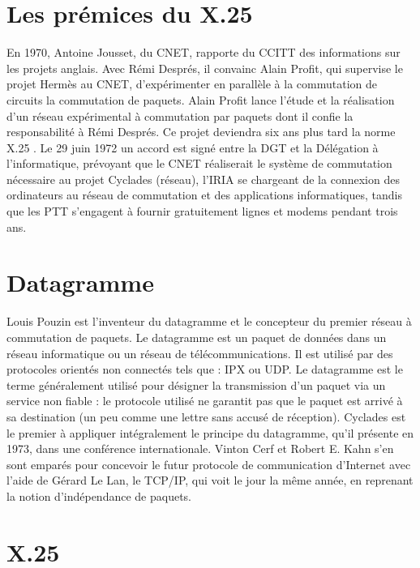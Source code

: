 \documentclass[12pt]{report}
\begin{document}
\section{Les prémices du X.25}

En 1970, Antoine Jousset, du \gls{CNET}, rapporte du \gls{CCITT} des informations sur les projets anglais. Avec Rémi Després, il convainc Alain Profit, qui supervise le projet Hermès au CNET, d’expérimenter en parallèle à la commutation de circuits la commutation de paquets. Alain Profit lance l'étude et la réalisation d'un réseau expérimental à commutation par paquets dont il confie la responsabilité à Rémi Després. Ce projet deviendra six ans plus tard la norme X.25 \cite{wikicnet}. Le 29 juin 1972 un accord est signé entre la DGT et la Délégation à l’informatique, prévoyant que le CNET réaliserait le système de commutation nécessaire au projet Cyclades (réseau), l’IRIA se chargeant de la connexion des ordinateurs au réseau de commutation et des applications informatiques, tandis que les \gls{PTT} s’engagent à fournir gratuitement lignes et modems pendant trois ans.

\section{Datagramme}

Louis Pouzin est l'inventeur du datagramme et le concepteur du premier réseau à commutation de paquets.
Le datagramme est un paquet de données dans un réseau informatique ou un réseau de télécommunications. Il est utilisé par des protocoles orientés \og non connectés \fg tels que : IPX ou UDP. Le datagramme est le terme généralement utilisé pour désigner la transmission d'un paquet via un service non \og fiable \fg : le protocole utilisé ne garantit pas que le paquet est arrivé à sa destination (un peu comme une lettre sans accusé de réception). Cyclades est le premier à appliquer intégralement le principe du datagramme, qu'il présente en 1973, dans une conférence internationale. Vinton Cerf et Robert E. Kahn s'en sont emparés pour concevoir le futur protocole de communication d'Internet avec l'aide de Gérard Le Lan, le TCP/IP, qui voit le jour la même année, en reprenant la notion d'indépendance de paquets.

\section{X.25}
\end{document}
